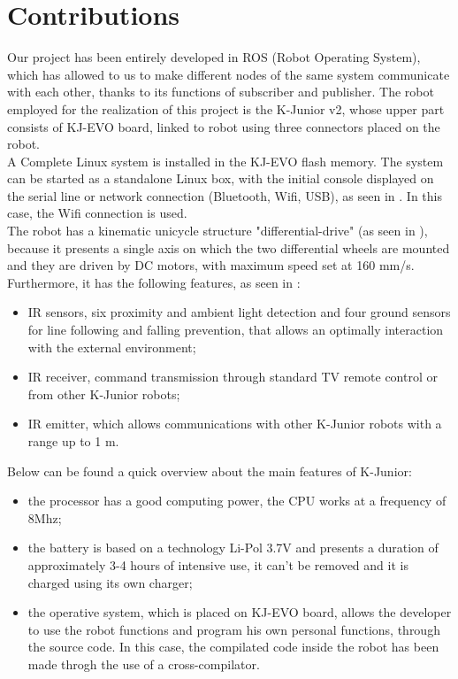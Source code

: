 \documentclass[a4paper,11pt,oneside]{book}
\begin{document}
\section*{Contributions}
Our project has been entirely developed in ROS (Robot Operating System), which has allowed to us to make different nodes of the same system communicate with each other, thanks to its functions of subscriber and publisher. The robot employed for the realization of this project is the K-Junior v2, whose upper part consists of KJ-EVO board, linked to robot using three connectors placed on the robot.
\\A Complete Linux system is installed in the KJ-EVO flash memory. The system can be started as a standalone Linux box, with the initial console displayed on the serial line or network connection (Bluetooth, Wifi, USB), as seen in \cite{MR-GB:22}. In this case, the Wifi connection is used.
\\The robot has a kinematic unicycle structure "differential-drive" (as seen in \cite{MR-GB:33}), because it presents a single axis on which the two differential wheels are mounted and they are driven by DC motors, with maximum speed set at 160 mm/s. Furthermore, it has the following features, as seen in \cite{MR-GB:44}:
\begin{itemize}
\item IR sensors, six proximity and ambient light detection and four ground
sensors for line following and falling prevention, that allows an optimally interaction with the external environment;
\item IR receiver, command transmission through standard TV remote
control or from other K-Junior robots;
\item IR emitter, which allows communications with other K-Junior robots with a range up to 1 m.
\end{itemize}
Below can be found a quick overview about the main features of K-Junior:
\begin{itemize}
\item the processor has a good computing power, the CPU works at a frequency of 8Mhz;
\item the battery is based on a technology Li-Pol 3.7V and presents a duration of approximately 3-4 hours of intensive use, it can't be removed and it is charged using its own charger;
\item the operative system, which is placed on KJ-EVO board, allows the developer to use the robot functions and program his own personal functions, through the source code. In this case, the compilated code inside the robot has been made throgh the use of a cross-compilator.
\end{itemize}
\end{document}

